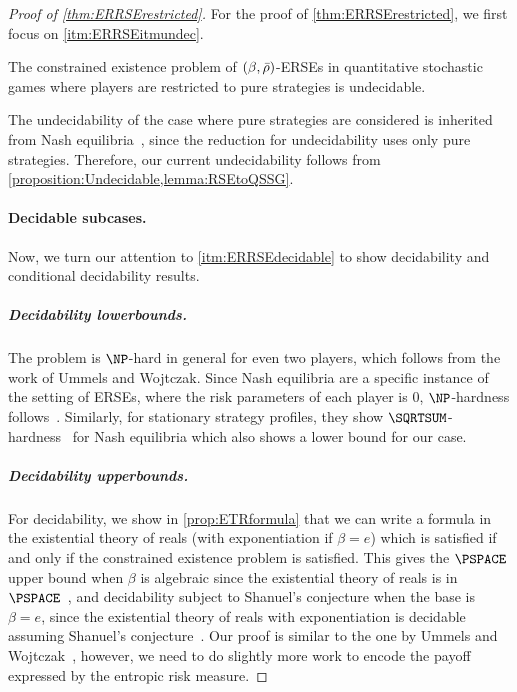 \stationaryRSE*
\begin{proof}[Proof of \cref{thm:ERRSErestricted}]
For the proof of \cref{thm:ERRSErestricted}, we first focus on \cref{itm:ERRSEitmundec}.
\begin{proposition}
    The constrained existence problem of $(\beta,{\bar{\rho}})$-ERSEs in quantitative stochastic games where players are restricted to pure strategies is undecidable.
\end{proposition}
\begin{claimproof}
The undecidability of the case where pure strategies are considered is inherited from Nash equilibria~\cite[Theorem~4.9]{UW11}, since the reduction for undecidability uses only pure strategies. Therefore, our current undecidability follows from \cref{proposition:Undecidable,lemma:RSEtoQSSG}.  
\end{claimproof}


\paragraph*{Decidable subcases.} Now, we turn our attention to \cref{itm:ERRSEdecidable} to show decidability and conditional decidability results. 
\subparagraph*{Decidability lowerbounds.} The problem is $\NP$-hard in general for even two players, which follows from  the work of Ummels and Wojtczak.
Since Nash equilibria are a specific instance of the setting of ERSEs, where the risk parameters of each player is $0$, $\NP$-hardness follows~\cite[Theorem 4.4]{UW11}. 
Similarly, for stationary strategy profiles, they show $\SQRTSUM$-hardness~\cite[Theorem 4.6]{UW11} for Nash equilibria which also shows a lower bound for our case. 

\subparagraph*{Decidability upperbounds.} For decidability, we show in \cref{prop:ETRformula} that we can write a formula in the existential theory of reals (with exponentiation if $\beta=e$)
which is satisfied if and only if the constrained existence problem is satisfied. This gives the $\PSPACE$ upper bound when $\beta$ is algebraic since the existential theory of reals is in $\PSPACE$~\cite{Can88}, and decidability subject to Shanuel's conjecture when the base is $\beta = e$, since the existential theory of reals with exponentiation is decidable assuming Shanuel's conjecture~\cite{MW95}.
Our proof is similar to the one by Ummels and Wojtczak~\cite[Theorem 4.5]{UW11}, however, we need to do slightly more work to encode the payoff expressed by the entropic risk measure. %




\end{proof}
